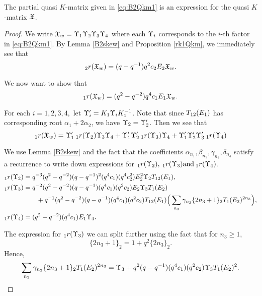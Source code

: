 \documentclass[a4 paper, 10pt]{article}
\begin{document}
\begin{proposition}
 The partial quasi $K$-matrix given in \eqref{eq:B2Qkm1} is an expression for the quasi $K$-matrix $\mathfrak{X}$.
\end{proposition}

\begin{proof}

We write $\mathfrak{X}_{w} = \Upsilon_{1}\Upsilon_{2}\Upsilon_{3}\Upsilon_{4}$ where each $\Upsilon_{i}$ corresponds to the $i$-th factor in \eqref{eq:B2Qkm1}. By Lemma \ref{B2skew} and Proposition \ref{rk1Qkm}, we immediately see that 
	\begin{equation}
		{}_{2}r(\mathfrak{X}_{w}) = (q - q^{-1})q^2c_2 E_2 \mathfrak{X}_{w}.
	\end{equation}

We now want to show that
	\begin{equation}
		{}_{1}r(\mathfrak{X}_{w}) = (q^2 - q^{-2})q^4c_1 E_1 \mathfrak{X}_{w}.
	\end{equation}

For each $i = 1, 2, 3, 4,$ let $\Upsilon^{\prime}_{i} = K_1 \Upsilon_{i} K_1^{-1}$. Note that since $T_{12}(E_1)$ has corresponding root $\alpha_1 + 2\alpha_2$, we have $\Upsilon_{2} = \Upsilon^{\prime}_{2}$. Then we see that
	\begin{equation}
		{}_{1}r(\mathfrak{X}_{w}) = \Upsilon^{\prime}_{1} \: {}_{1}r(\Upsilon_{2}) \Upsilon_{3} \Upsilon_{4} + \Upsilon^{\prime}_{1} \Upsilon^{\prime}_{2} \: {}_{1}r(\Upsilon_{3}) \Upsilon_{4} + \Upsilon^{\prime}_{1} \Upsilon^{\prime}_{2} \Upsilon^{\prime}_{3} \: {}_{1}r(\Upsilon_{4})
	\end{equation}

We use Lemma \eqref{B2skew} and the fact that the coefficients $\alpha_{n_1}, \beta_{n_2}, \gamma_{n_3}, \delta_{n_4}$ satisfy a recurrence to write down expressions for ${}_{1}r(\Upsilon_2), \: {}_{1}r(\Upsilon_3) \text{and} \: {}_{1}r(\Upsilon_4)$. 
	\begin{align*}
		{}_{1}r(\Upsilon_2) &= q^{ -3 } ( q^{ 2 } - q^{ -2 } ) ( q - q^{ -1 } )^{ 2 } ( q^{ 4 } c_1 ) ( q^{ 4 } c_2^{ 2 } ) E_2^{ 2 } \Upsilon_{2} T_{12}(E_1), \\ 	
		{}_{1}r(\Upsilon_3) 	&= q^{ -2 } ( q^{ 2 } - q^{ -2 } ) ( q - q^{ -1 } ) ( q^{ 4 } c_1 ) ( q^{ 2 } c_2 ) E_2 \Upsilon_{3} T_{1}(E_2) \\
						&\qquad{} + q^{ -1 } ( q^{ 2 } - q^{ -2 } )( q - q^{ -1 } ) ( q^{ 4 } c_1 ) ( q^{ 2 } c_2 ) T_{12}(E_1) \Big( \sum_{n_3} \gamma_{n_3} \{ 2n_3 + 1 \}_{2} T_{1}(E_2)^{2n_3} \Big), \\
		{}_{1}r(\Upsilon_4)		&= ( q^{ 2 } - q^{ -2 } ) ( q^{ 4 } c_1 ) E_1 \Upsilon_{4}.		
	\end{align*}
	
The expression for $ {}_{1}r(\Upsilon_3)$ we can split further using the fact that for $n_3 \geq 1$, \[ \{ 2n_3 + 1 \}_{2} = 1 + q^{ 2 }\{ 2n_3 \}_{2}. \]
Hence,
	\begin{align*}
		\sum_{n_3} \gamma_{n_3} \{ 2n_3 + 1 \}_{2} T_{1}(E_2)^{2n_3} = \Upsilon_{3} + q^{ 2 } ( q - q^{ -1 } ) ( q^{ 4 } c_1 ) ( q^{ 2 } c_2 ) \Upsilon_{3} T_{1}(E_2)^{ 2 }.
	\end{align*}


\end{proof}
\end{document}
